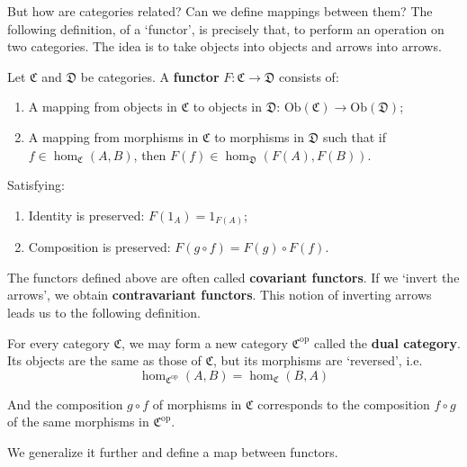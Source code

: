 But how are categories related? Can we define mappings between them? The following definition, of a `functor', is precisely that, to perform an operation on two categories. The idea is to take objects into objects and arrows into arrows.

\begin{definition}[Functor]
	Let $\mathfrak{C}$ and $\mathfrak{D}$ be categories. A \textbf{functor} $F : \mathfrak{C} \longrightarrow \mathfrak{D}$ consists of:
	\begin{enumerate}
		\item A mapping from objects in $\mathfrak{C}$ to objects in $\mathfrak{D}$: $\text{Ob} (\mathfrak{C}) \longrightarrow \text{Ob} (\mathfrak{D})$;
		\item A mapping from morphisms in $\mathfrak{C}$ to morphisms in $\mathfrak{D}$ such that if $f \in \hom_\mathfrak{C}(A,B)$, then $F(f) \in \hom_\mathfrak{D}(F(A), F(B))$.
	\end{enumerate}
	Satisfying:
	\begin{enumerate}
		\item Identity is preserved: $F(1_A) = 1_{F(A)}$;
		\item Composition is preserved: $F(g \circ f) = F(g) \circ F(f)$.
	\end{enumerate}
\end{definition}

The functors defined above are often called \textbf{covariant functors}. If we `invert the arrows', we obtain \textbf{contravariant functors}. This notion of inverting arrows leads us to the following definition.

\begin{definition}
	For every category $\mathfrak{C}$, we may form a new category $\mathfrak{C}^{\text{op}}$ called the \textbf{dual category}. Its objects are the same as those of $\mathfrak{C}$, but its morphisms are `reversed', i.e.
	\[
		\hom_{\mathfrak{C}^{\text{op}}}(A,B) = \hom_\mathfrak{C}(B,A)
	\]

	And the composition $g \circ f$ of morphisms in $\mathfrak{C}$ corresponds to the composition $f \circ g$ of the same morphisms in $\mathfrak{C}^{\text{op}}$.
\end{definition}

We generalize it further and define a map between functors.

